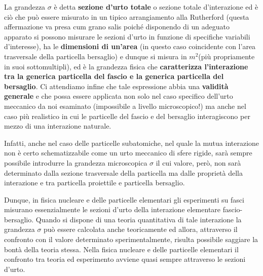 La grandezza \(\sigma\) è detta \textbf{sezione d'urto totale} o sezione
totale d'interazione ed è ciò che può essere misurato in un tipico
arrangiamento alla Rutherford (questa affermazione va presa cum grano
salis poiché disponendo di un adeguato apparato si possono misurare le
sezioni d'urto in funzione di specifiche variabili d'interesse), ha le
\textbf{dimensioni di un'area} (in questo caso coincidente con l'area
trasversale della particella bersaglio) e dunque si misura in
\(m^2\)(più propriamente in suoi sottomultipli), ed è la grandezza
fisica che \textbf{caratterizza l'interazione tra la generica particella
del fascio e la generica particella del bersaglio}.
Ci attendiamo infine
che tale espressione abbia una \textbf{validità generale} e che possa
essere applicata non solo nel caso specifico dell'urto meccanico da noi
esaminato (impossibile a livello microscopico!) ma anche nel caso più
realistico in cui le particelle del fascio e del bersaglio interagiscono
per mezzo di una interazione naturale.

Infatti, anche nel caso delle particelle subatomiche, nel quale la mutua
interazione non è certo schematizzabile come un urto meccanico di sfere
rigide, sarà sempre possibile introdurre la grandezza microscopica
\(\sigma\) il cui valore, però, non sarà determinato dalla sezione
trasversale della particella ma dalle proprietà della interazione e tra
particella proiettile e particella bersaglio.

Dunque, in fisica nucleare e delle particelle elementari gli esperimenti
su fasci misurano essenzialmente le sezioni d'urto della interazione
elementare fascio-bersaglio.
Quando si dispone di una teoria
quantitativa di tale interazione la grandezza \(\sigma\) può essere
calcolata anche teoricamente ed allora, attraverso il confronto con il
valore determinato sperimentalmente, risulta possibile saggiare la bontà
della teoria stessa.
Nella fisica nucleare e delle particelle elementari
il confronto tra teoria ed esperimento avviene quasi sempre attraverso
le sezioni d'urto.

